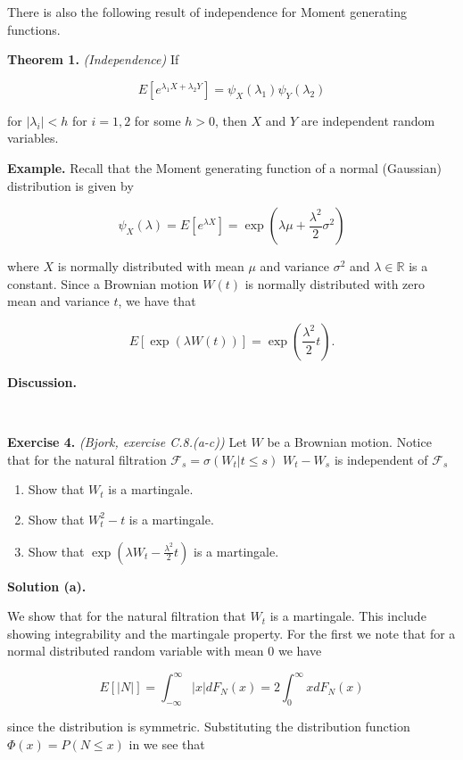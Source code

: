 \documentclass[
]{article}
\providecommand{\tightlist}{%
  \setlength{\itemsep}{0pt}\setlength{\parskip}{0pt}}
\begin{document}
There is also the following result of independence for Moment generating
functions.

\textbf{Theorem 1.} \emph{(Independence)} If

\[E\left[e^{\lambda_1X+\lambda_2Y}\right]=\psi_X(\lambda_1)\psi_Y(\lambda_2)\]

for \(\vert\lambda_i\vert<h\) for \(i=1,2\) for some \(h>0\), then \(X\)
and \(Y\) are independent random variables.

\textbf{Example.} Recall that the Moment generating function of a normal
(Gaussian) distribution is given by

\[\psi_X(\lambda)=E\left[e^{\lambda X}\right]=\exp\left(\lambda \mu + \frac{\lambda^2}{2}\sigma^2\right)\]

where \(X\) is normally distributed with mean \(\mu\) and variance
\(\sigma^2\) and \(\lambda\in\mathbb{R}\) is a constant. Since a
Brownian motion \(W(t)\) is normally distributed with zero mean and
variance \(t\), we have that

\[E[\exp(\lambda W(t))]=\exp\left(\frac{\lambda^2}{2}t\right).\]

\textbf{Discussion.}

~

\textbf{Exercise 4.} \emph{(Bjork, exercise C.8.(a-c))} Let \(W\) be a
Brownian motion. Notice that for the natural filtration
\(\mathcal{F}_s=\sigma(W_t\vert t\le s)\) \(W_t-W_s\) is independent of
\(\mathcal{F}_s\)

\begin{enumerate}
\def\labelenumi{\alph{enumi}.}
\tightlist
\item
  Show that \(W_t\) is a martingale.
\item
  Show that \(W^2_t-t\) is a martingale.
\item
  Show that \(\exp(\lambda W_t-\frac{\lambda^2}{2}t)\) is a martingale.
\end{enumerate}

\textbf{Solution (a).}

We show that for the natural filtration that \(W_t\) is a martingale.
This include showing integrability and the martingale property. For the
first we note that for a normal distributed random variable with mean 0
we have

\[E[\vert N\vert]=\int_{-\infty}^\infty \vert x\vert dF_N(x)=2\int_{0}^\infty xdF_N(x)\]

since the distribution is symmetric. Substituting the distribution
function \(\Phi(x)=P(N\le x)\) in we see that
\end{document}
